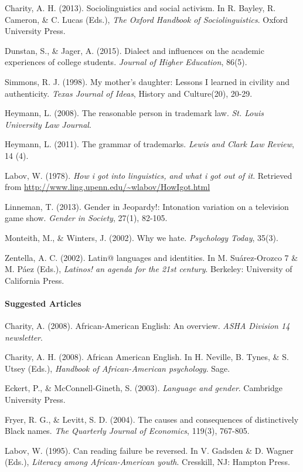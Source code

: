 \documentclass[]{article}
\let\oldparagraph\paragraph
\renewcommand{\paragraph}[1]{\oldparagraph{#1}\mbox{}}
\begin{document}
Charity, A. H. (2013). Sociolinguistics and social activism. In R. Bayley, R. Cameron, \& C. Lucas (Eds.), \emph{The Oxford Handbook of Sociolinguistics}. Oxford University Press.

Dunstan, S., \& Jager, A. (2015). Dialect and influences on the academic experiences of college students. \emph{Journal of Higher Education}, 86(5).

Simmons, R. J. (1998). My mother’s daughter: Lessons I learned in civility and authenticity. \emph{Texas Journal of Ideas}, History and Culture(20), 20-29.

Heymann, L. (2008). The reasonable person in trademark law. \emph{St. Louis University Law Journal}.

Heymann, L. (2011). The grammar of trademarks. \emph{Lewis and Clark Law Review}, 14 (4).


Labov, W. (1978). \emph{How i got into linguistics, and what i got out of it}. Retrieved from \url{http://www.ling.upenn.edu/~wlabov/HowIgot.html}

Linneman, T. (2013). Gender in Jeopardy!: Intonation variation on a television game show. \emph{Gender in Society}, 27(1), 82-105.

Monteith, M., \& Winters, J. (2002). Why we hate. \emph{Psychology Today}, 35(3).

Zentella, A. C. (2002). Latin@ languages and identities. In M. Su\'{a}rez-Orozco 7 \& M. P\'{a}ez (Eds.), \emph{Latinos! an agenda for the 21st century}. Berkeley: University of California Press.

\paragraph{Suggested Articles}\label{suggested-articles}

Charity, A. (2008). African-American English: An overview. \emph{ASHA Division 14 newsletter}.

Charity, A. H. (2008). African American English. In H. Neville, B. Tynes, \& S. Utsey (Eds.), \emph{Handbook of African-American psychology}. Sage.

Eckert, P., \& McConnell-Gineth, S. (2003). \emph{Language and gender}. Cambridge University Press.

Fryer, R. G., \& Levitt, S. D. (2004). The causes and consequences of distinctively Black names. \emph{The Quarterly Journal of Economics}, 119(3), 767-805.

Labov, W. (1995). Can reading failure be reversed. In V. Gadsden \& D. Wagner (Eds.), \emph{Literacy among African-American youth}. Cresskill, NJ: Hampton Press.
\end{document}
